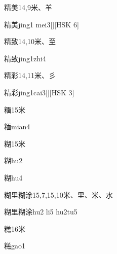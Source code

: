\begin{Entry}{精美}{14,9}{⽶、⽺}
  \begin{Phonetics}{精美}{jing1 mei3}[][HSK 6]
  \end{Phonetics}
\end{Entry}

\begin{Entry}{精致}{14,10}{⽶、⾄}
  \begin{Phonetics}{精致}{jing1zhi4}
  \end{Phonetics}
\end{Entry}

\begin{Entry}{精彩}{14,11}{⽶、⼺}
  \begin{Phonetics}{精彩}{jing1cai3}[][HSK 3]
  \end{Phonetics}
\end{Entry}

\begin{Entry}{糆}{15}{⽶}
  \begin{Phonetics}{糆}{mian4}
  \end{Phonetics}
\end{Entry}

\begin{Entry}{糊}{15}{⽶}
  \begin{Phonetics}{糊}{hu2}
  \end{Phonetics}
  \begin{Phonetics}{糊}{hu4}
  \end{Phonetics}
\end{Entry}

\begin{Entry}{糊里糊涂}{15,7,15,10}{⽶、⾥、⽶、⽔}
  \begin{Phonetics}{糊里糊涂}{hu2 li5 hu2tu5}
  \end{Phonetics}
\end{Entry}

\begin{Entry}{糕}{16}{⽶}
  \begin{Phonetics}{糕}{gao1}
  \end{Phonetics}
\end{Entry}

